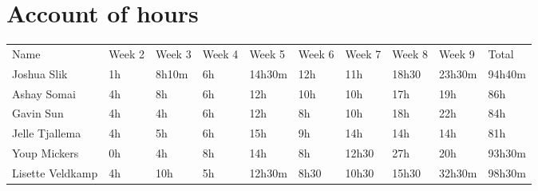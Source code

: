 \chapter{Account of hours}

\begin{table}[h]
\begin{tabular}{l | l | l | l | l | l | l | l | l | l}
Name             & Week 2 & Week 3 & Week 4 & Week 5 & Week 6 & Week 7 & Week 8 & Week 9 & Total  \\
Joshua Slik      & 1h     & 8h10m  & 6h     & 14h30m & 12h    & 11h    & 18h30  & 23h30m & 94h40m \\
Ashay Somai      & 4h     & 8h     & 6h     & 12h    & 10h    & 10h    & 17h    & 19h    & 86h    \\
Gavin Sun        & 4h     & 4h     & 6h     & 12h    & 8h     & 10h    & 18h    & 22h    & 84h    \\
Jelle Tjallema   & 4h     & 5h     & 6h     & 15h    & 9h     & 14h    & 14h    & 14h    & 81h    \\
Youp Mickers     & 0h     & 4h     & 8h     & 14h    & 8h     & 12h30  & 27h    & 20h    & 93h30m \\
Lisette Veldkamp & 4h     & 10h    & 5h     & 12h30m & 8h30   & 10h30  & 15h30  & 32h30m & 98h30m \\
\end{tabular}
\end{table}
